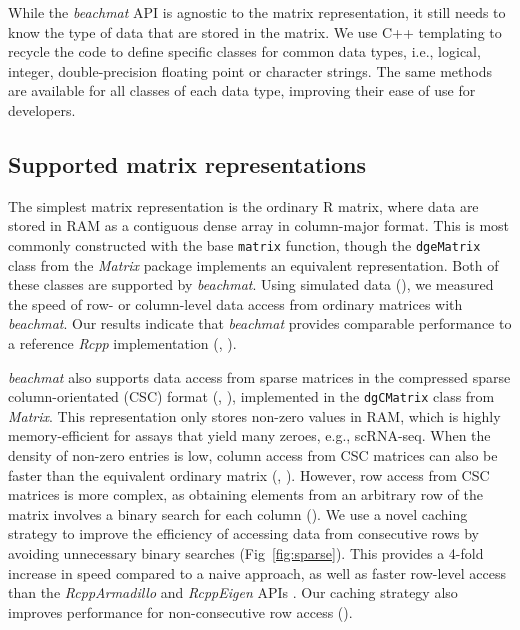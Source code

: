 \documentclass[10pt,letterpaper]{article}
\newcommand{\beachmat}{\textit{beachmat}}
\begin{document}
While the \beachmat{} API is agnostic to the matrix representation, it still needs to know the type of data that are stored in the matrix.
We use C++ templating to recycle the code to define specific classes for common data types, i.e., logical, integer, double-precision floating point or character strings.
The same methods are available for all classes of each data type, improving their ease of use for developers.

\subsection*{Supported matrix representations}
The simplest matrix representation is the ordinary R matrix, where data are stored in RAM as a contiguous dense array in column-major format.
This is most commonly constructed with the base \texttt{matrix} function, though the \texttt{dgeMatrix} class from the \textit{Matrix} package implements an equivalent representation.
Both of these classes are supported by \beachmat{}.
Using simulated data (\suppsecsimdesign{}), we measured the speed of row- or column-level data access from ordinary matrices with \beachmat{}.
Our results indicate that \beachmat{} provides comparable performance to a reference \textit{Rcpp} implementation 
(\suppsecsimple{}, \suppfigsimpleaccess{}). 

\beachmat{} also supports data access from sparse matrices in the compressed sparse column-orientated (CSC) format (\suppsecsparseschem{}, \suppfigsparseschem{}), implemented in the \texttt{dgCMatrix} class from \textit{Matrix}.
This representation only stores non-zero values in RAM, which is highly memory-efficient for assays that yield many zeroes, e.g., scRNA-seq.
When the density of non-zero entries is low, column access from CSC matrices can also be faster than the equivalent ordinary matrix (\suppsecsparsecol{}, \suppfigsparsecol{}).
However, row access from CSC matrices is more complex, as obtaining elements from an arbitrary row of the matrix involves a binary search for each column (\suppsecsparserow{}).
We use a novel caching strategy to improve the efficiency of accessing data from consecutive rows by avoiding unnecessary binary searches (Fig~\ref{fig:sparse}).
This provides a 4-fold increase in speed compared to a naive approach, as well as faster row-level access than the \textit{RcppArmadillo} and \textit{RcppEigen} APIs \cite{eddelbuettel2014arma,bates2013fast}.
Our caching strategy also improves performance for non-consecutive row access (\suppfigsparserandom{}).
\end{document}
